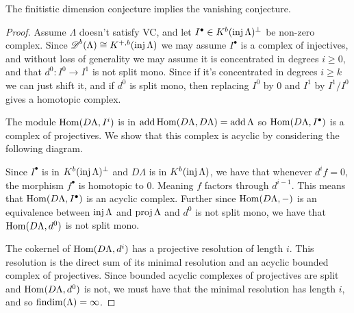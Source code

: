 \begin{theorem} \cite[1.2]{Hap93} \label{thm:FDC_implies_VC}
	The finitistic dimension conjecture implies the vanishing conjecture.
	\begin{proof}
		Assume $\Lambda$ doesn't satisfy VC, and let $I^\bullet \in K^b(\operatorname{inj}\Lambda)^\perp$ be non-zero complex. Since $\operatorname{\mathscr{D}}^b(\Lambda) \cong K^{+,b}(\operatorname{inj}\Lambda)$ we may assume $I^\bullet$ is a complex of injectives, and without loss of generality we may assume it is concentrated in degrees $i \geq 0$, and that $d^0\colon I^0 \to I^1$ is not split mono. Since if it's concentrated in degrees $i \geq k$ we can just shift it, and if $d^0$ is split mono, then replacing $I^0$ by $0$ and $I^1$ by $I^1/I^0$ gives a homotopic complex.
			
		The module $\operatorname{Hom}(D\Lambda, I^i)$ is in $\operatorname{add}\operatorname{Hom}(D\Lambda, D\Lambda) = \operatorname{add}\Lambda$ so $\operatorname{Hom}(D\Lambda, I^\bullet)$ is a complex of projectives. We show that this complex is acyclic by considering the following diagram.
		
		\begin{center}
		\end{center}
		
		Since $I^\bullet$ is in $K^b(\operatorname{inj}\Lambda)^\perp$ and $D\Lambda$ is in $K^b(\operatorname{inj}\Lambda)$, we have that whenever $d^if=0$, the morphism $f^\bullet$ is homotopic to 0. Meaning $f$ factors through $d^{i-1}$. This means that $\operatorname{Hom}(D\Lambda, I^\bullet)$ is an acyclic complex. Further since $\operatorname{Hom}(D\Lambda, -)$ is an equivalence between $\operatorname{inj}\Lambda$ and $\operatorname{proj}\Lambda$ and $d^0$ is not split mono, we have that $\operatorname{Hom}(D\Lambda, d^0)$ is not split mono.
		
		The cokernel of $\operatorname{Hom}(D\Lambda, d^i)$ has a projective resolution of length $i$. This resolution is the direct sum of its minimal resolution and an acyclic bounded complex of projectives. Since bounded acyclic complexes of projectives are split and $\operatorname{Hom}(D\Lambda, d^0)$ is not, we must have that the minimal resolution has length $i$, and so $\operatorname{findim}(\Lambda) = \infty$.
	\end{proof}
\end{theorem}

